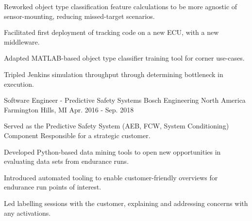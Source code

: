 \begin{cventries}
{\begin{cvitems}
        \item {Reworked object type classification feature calculations to be more agnostic of sensor-mounting, reducing missed-target scenarios.}
        \iflongform        
          \item {Facilitated first deployment of tracking code on a new ECU, with a new middleware.}
          \item {Adapted MATLAB-based object type classifier training tool for corner use-cases.}
          \item {Tripled Jenkins simulation throughput through determining bottleneck in execution.}
        \fi
      \end{cvitems}
    }

  \cventry
    {Software Engineer - Predictive Safety Systems} %
    {Bosch Engineering North America} %
    {Farmington Hills, MI} %
    {Apr. 2016 - Sep. 2018} %
    {
      \begin{cvitems} %
        \item {Served as the Predictive Safety System (AEB, FCW, System Conditioning) Component Responsible for a strategic customer.}
        \item {Developed Python-based data mining tools to open new opportunities in evaluating data sets from endurance runs.}
        \item {Introduced automated tooling to enable customer-friendly overviews for endurance run points of interest.}
        \item {Led labelling sessions with the customer, explaining and addressing concerns with any activations.}
      \end{cvitems}
    }


\end{cventries}
